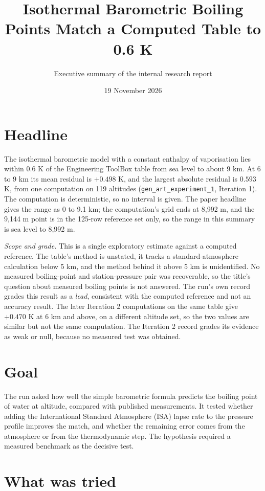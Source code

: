 \documentclass[11pt,letterpaper]{article}
\title{Isothermal Barometric Boiling Points Match a Computed Table to 0.6 K}
\author{Executive summary of the internal research report}
\date{19 November 2026}
\begin{document}
\maketitle

\section{Headline}

The isothermal barometric model with a constant enthalpy of vaporisation lies within 0.6 K of the Engineering ToolBox table from sea level to about 9 km. At 6 to 9 km its mean residual is $+0.498$ K, and the largest absolute residual is $0.593$ K, from one computation on 119 altitudes (\texttt{gen\_art\_experiment\_1}, Iteration 1). The computation is deterministic, so no interval is given. The paper headline gives the range as 0 to 9.1 km; the computation's grid ends at 8,992 m, and the 9,144 m point is in the 125-row reference set only, so the range in this summary is sea level to 8,992 m.

\emph{Scope and grade.} This is a single exploratory estimate against a computed reference. The table's method is unstated, it tracks a standard-atmosphere calculation below 5 km, and the method behind it above 5 km is unidentified. No measured boiling-point and station-pressure pair was recoverable, so the title's question about measured boiling points is not answered. The run's own record grades this result as a \emph{lead}, consistent with the computed reference and not an accuracy result. The later Iteration 2 computations on the same table give $+0.470$ K at 6 km and above, on a different altitude set, so the two values are similar but not the same computation. The Iteration 2 record grades its evidence as weak or null, because no measured test was obtained.

\section{Goal}

The run asked how well the simple barometric formula predicts the boiling point of water at altitude, compared with published measurements. It tested whether adding the International Standard Atmosphere (ISA) lapse rate to the pressure profile improves the match, and whether the remaining error comes from the atmosphere or from the thermodynamic step. The hypothesis required a measured benchmark as the decisive test.

\section{What was tried}
\end{document}
